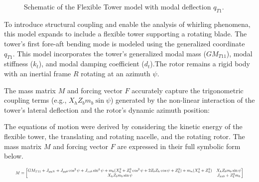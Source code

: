 \documentclass[final,onecolumn]{IEEEtran}
\begin{document}
\begin{figure}[htbp]
    \caption{Schematic of the Flexible Tower model with modal deflection $q_{T1}$.}
    \label{fig:flexible_tower_model}
\end{figure}

To introduce structural coupling and enable the analysis of whirling phenomena, this model expands to include a flexible tower supporting a rotating blade. The tower's first fore-aft bending mode is modeled using the generalized coordinate $q_{T1}$. This model incorporates the tower's generalized modal mass ($GM_{T11}$), modal stiffness ($k_{t}$), and modal damping coefficient ($d_{t}$).The rotor remains a rigid body with an inertial frame $R$ rotating at an azimuth $\psi$.

The mass matrix $M$ and forcing vector $F$ accurately capture the trigonometric coupling terms (e.g., $X_{h} Z_{b} m_{b} \sin\psi$) generated by the non-linear interaction of the tower's lateral deflection and the rotor's dynamic azimuth position:

The equations of motion were derived by considering the kinetic energy of the flexible tower, the translating and rotating nacelle, and the rotating rotor. The mass matrix $M$ and forcing vector $F$ are expressed in their full symbolic form below.

\begin{equation}
    \label{eq:flex_tower_mass_matrix}
    \resizebox{0.95\textwidth}{!}{%
        $M = \begin{bmatrix}
                GM_{T11} + J_{yy N} + J_{yyb} \cos^{2}\psi + J_{zzb} \sin^{2}\psi + m_{b} (X_{h}^{2} + Z_{b}^{2} \cos^{2}\psi + 2 Z_{b} Z_{h} \cos\psi + Z_{h}^{2}) + m_{n} (X_{n}^{2} + Z_{n}^{2}) & X_{h} Z_{b} m_{b} \sin\psi \\
                X_{h} Z_{b} m_{b} \sin\psi                                                                                                                                                          & J_{xxb} + Z_{b}^{2} m_{b}
            \end{bmatrix}$%
    }
\end{equation}
\end{document}
